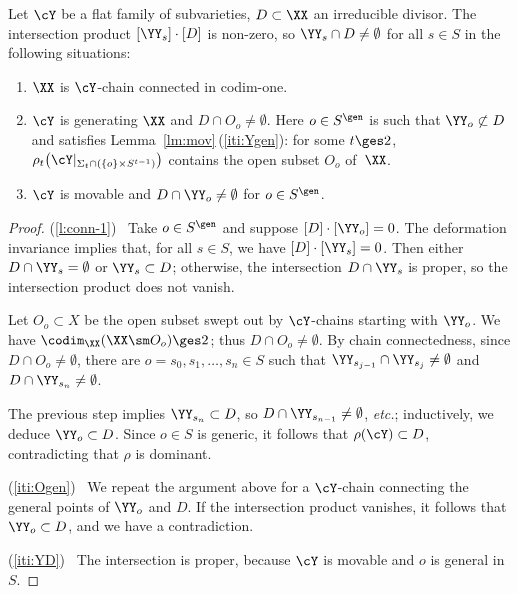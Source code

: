 \begin{m-lemma}\label{lm:conn}
Let $\cY$ be a flat family of subvarieties, $D\subset\XX$ an irreducible divisor. The intersection product $[\YY_s]\cdot[D]$ is non-zero, so $\YY_s\cap D\neq\emptyset$ for all $s\in S$ in the following situations:
\begin{enumerate}
\item\label{l:conn-1}
$\XX$ is $\cY$-chain connected in codim-one.
\item\label{iti:Ogen} 
  $\cY$ is generating $\XX$ and $D\cap O_o\neq\emptyset$. Here $o\in S^\gen$ is such that $\YY_o\not\subset D$ and satisfies Lemma~\ref{lm:mov}\,{\rm(\ref{iti:Ygen})}: for some $t\ges 2$, $\rho_t\bigl(\cY|_{\Sigma_t\cap(\{o\}\times S^{t-1})}\bigr)$ contains the open subset $O_o$ of\, $\XX$. 
\item\label{iti:YD} 
$\cY$ is movable and $D\cap\YY_o\neq\emptyset$ for $o\in S^\gen$.
\end{enumerate}

\end{m-lemma}

\begin{proof}
(\ref{l:conn-1})~ Take $o\in S^\gen$ and suppose $[D]\cdot [\YY_o]=0$. The deformation invariance implies that, for all $s\in S$, we have $[D]\cdot[\YY_s]=0$. Then either $D\cap \YY_s=\emptyset$ or $\YY_s\subset D$; otherwise, the intersection $D\cap\YY_s$ is proper, so the intersection product does not vanish.  

 Let $O_o\subset X$ be the open subset swept out by $\cY$-chains starting with $\YY_o$. We have $\codim_\XX(\XX\sm O_o)\ges2$; thus $D\cap O_o\neq\emptyset$.  By chain connectedness, since $D\cap O_o\neq\emptyset$, there are $o=s_0,s_1,\dots,s_n\in S$ such that 
$\YY_{s_{j-1}}\cap \YY_{s_j}\neq\emptyset$ and $D\cap \YY_{s_n}\neq\emptyset$.

 The previous step implies $\YY_{s_n}\subset D$, so $D\cap \YY_{s_{n-1}} \neq\emptyset$, \textit{etc.}; inductively, we deduce $\YY_o\subset D$. Since $o\in S$ is generic, it follows that $\rho(\cY)\subset D$, contradicting that $\rho$ is dominant.

(\ref{iti:Ogen})~ 
 We repeat the argument above for a $\cY$-chain connecting the general points of $\YY_o$ and $D$. If the intersection product vanishes, it follows that $\YY_o\subset D$, and we have a contradiction. 
 
 (\ref{iti:YD})~ 
The intersection is proper, because $\cY$ is movable and $o$ is general in $S$.
\end{proof}

